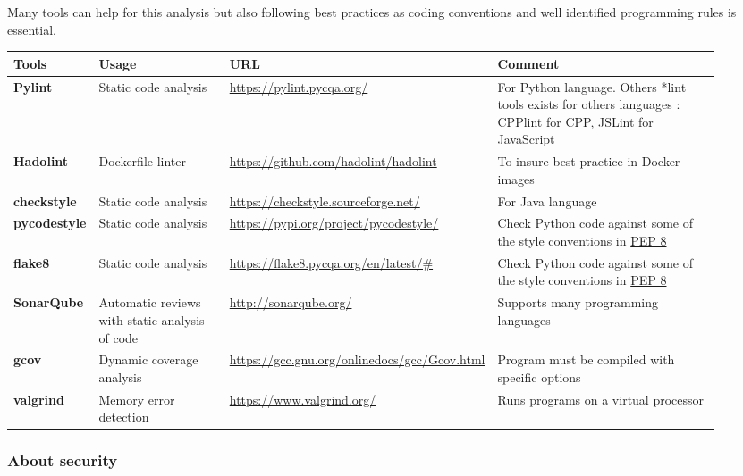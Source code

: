Many tools can help for this analysis but also following best
practices as coding conventions and well identified programming rules
is essential.

\begin{center}
  \label{tab:tools_pack}
  \small
  \begin{tabular}{|p{0.12\linewidth}|p{0.2\linewidth}|p{0.25\linewidth}|p{0.35\linewidth}|} \hline

    \textbf{Tools} & \textbf{Usage} & \textbf{URL} & \textbf{Comment} \\ \hline \hline
    \textbf{Pylint} & Static code analysis & \url{https://pylint.pycqa.org/}
    & For Python language. Others *lint tools exists for others
    languages : CPPlint for CPP, JSLint for JavaScript \\ \hline
    \textbf{Hadolint} & Dockerfile linter & \url{https://github.com/hadolint/hadolint}
    & To insure best practice in Docker images \\ \hline
    \textbf{checkstyle} & Static code analysis & \url{https://checkstyle.sourceforge.net/}
    & For Java language  \\ \hline
    \textbf{pycodestyle} & Static code analysis & \url{https://pypi.org/project/pycodestyle/}
    & Check Python code against some of the style conventions in \href{http://www.python.org/dev/peps/pep-0008/}{PEP 8}  \\ \hline
    \textbf{flake8} & Static code analysis & \url{https://flake8.pycqa.org/en/latest/#}
    & Check Python code against some of the style conventions in \href{http://www.python.org/dev/peps/pep-0008/}{PEP 8} \\ \hline
    \textbf{SonarQube} & Automatic reviews with static analysis of code & \url{http://sonarqube.org/}
    & Supports many programming languages  \\ \hline
    \textbf{gcov} & Dynamic coverage analysis & \url{https://gcc.gnu.org/onlinedocs/gcc/Gcov.html}
    & Program must be compiled with specific options  \\ \hline
    \textbf{valgrind} & Memory error detection & \url{https://www.valgrind.org/}
    & Runs programs on a virtual processor  \\ \hline

  \end{tabular}
\end{center}


\subsubsection{About security}

